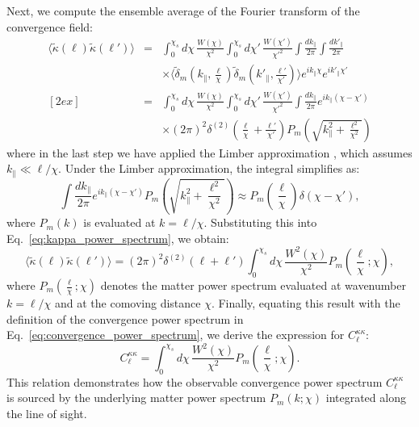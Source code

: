 Next, we compute the ensemble average of the Fourier transform of the convergence field:
\begin{eqnarray}
    \langle \tilde{\kappa}(\boldsymbol{\ell}) \tilde{\kappa}(\boldsymbol{\ell}') \rangle 
    &=& \int_0^{\chi_s} d\chi \, \frac{W(\chi)}{\chi^2} \int_0^{\chi_s} d\chi' \, \frac{W(\chi')}{\chi'^2} 
        \int \frac{dk_\parallel}{2\pi} \int \frac{dk'_\parallel}{2\pi} \nonumber \\
    && \times \langle \tilde{\delta}_m\left(k_\parallel, \frac{\boldsymbol{\ell}}{\chi}\right) 
       \tilde{\delta}_m\left(k'_\parallel, \frac{\boldsymbol{\ell}'}{\chi'}\right) \rangle 
       e^{i k_\parallel \chi} e^{i k'_\parallel \chi'} \nonumber \\
    [2ex]
    &=& \int_0^{\chi_s} d\chi \, \frac{W(\chi)}{\chi^2} \int_0^{\chi_s} d\chi' \, \frac{W(\chi')}{\chi'^2} 
        \int \frac{dk_\parallel}{2\pi} e^{i k_\parallel (\chi - \chi')} \nonumber \\
    && \times (2\pi)^2 \delta^{(2)}\left(\frac{\boldsymbol{\ell}}{\chi} + \frac{\boldsymbol{\ell}'}{\chi'}\right) 
       P_m\left(\sqrt{k_\parallel^2 + \frac{\ell^2}{\chi^2}}\right) \nonumber 
    \label{eq:kappa_power_spectrum}
\end{eqnarray}
where in the last step we have applied the Limber approximation \citep{1954ApJ...119..655L}, which assumes \( k_\parallel \ll \ell/\chi \).
Under the Limber approximation, the integral simplifies as:
\begin{equation}
    \int \frac{dk_\parallel}{2\pi} e^{i k_\parallel (\chi - \chi')} P_m\left(\sqrt{k_\parallel^2 + \frac{\ell^2}{\chi^2}}\right) \approx P_m\left(\frac{\ell}{\chi}\right) \delta(\chi - \chi'),
    \label{eq:limber_approximation}
\end{equation}
where \( P_m(k) \) is evaluated at \( k = \ell/\chi \).
Substituting this into Eq.~\eqref{eq:kappa_power_spectrum}, we obtain:
\begin{equation}
    \langle \tilde{\kappa}(\boldsymbol{\ell}) \tilde{\kappa}(\boldsymbol{\ell}') \rangle = (2\pi)^2 \delta^{(2)}(\boldsymbol{\ell} + \boldsymbol{\ell}') \int_0^{\chi_s} d\chi \, \frac{W^2(\chi)}{\chi^2} P_m\left(\frac{\ell}{\chi}; \chi\right),
    \label{eq:kappa_power_spectrum_final}
\end{equation}
where \( P_m\left(\frac{\ell}{\chi}; \chi\right) \) denotes the matter power spectrum evaluated at wavenumber \( k = \ell/\chi \) and at the comoving distance \( \chi \).
Finally, equating this result with the definition of the convergence power spectrum in Eq.~\eqref{eq:convergence_power_spectrum}, we derive the expression for \( C_{\ell}^{\kappa\kappa} \):
\begin{equation}
    C_{\ell}^{\kappa\kappa} = \int_0^{\chi_s} d\chi \, \frac{W^2(\chi)}{\chi^2} P_m\left(\frac{\ell}{\chi}; \chi\right).
    \label{eq:convergence_power_spectrum_final}
\end{equation}
This relation demonstrates how the observable convergence power spectrum \( C_{\ell}^{\kappa\kappa} \) is sourced by the underlying matter power spectrum \( P_m(k; \chi) \) integrated along the line of sight.


